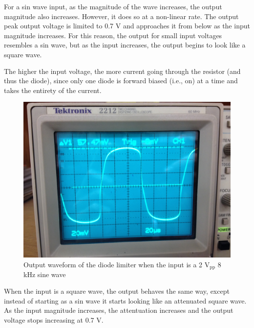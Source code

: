 \documentclass[12pt,letterpaper]{report}
\newlength \figwidth
\begin{document}
For a sin wave input, as the magnitude of the wave increases, the output magnitude also increases. However, it does so at a non-linear rate. The output peak output voltage is limited to 0.7 V and approaches it from below as the input magnitude increases. For this reason, the output for small input voltages resembles a sin wave, but as the input increases, the output begins to look like a square wave.

The higher the input voltage, the more current going through the resistor (and thus the diode), since only one diode is forward biased (i.e., on) at a time and takes the entirety of the current.

\begin{figure}[H]
\centering
\includegraphics[width=\figwidth, keepaspectratio=true]{lab4/3_7_1.jpg}
\caption{Output waveform of the diode limiter when the input is a 2 $\text{V}_{\text{pp}}$ 8 kHz sine wave}
\label{fig:3_7_1}
\end{figure}

When the input is a square wave, the output behaves the same way, except instead of starting as a sin wave it starts looking like an attenuated square wave. As the input magnitude increases, the attentuation increases and the output voltage stops increasing at 0.7 V.
\end{document}

